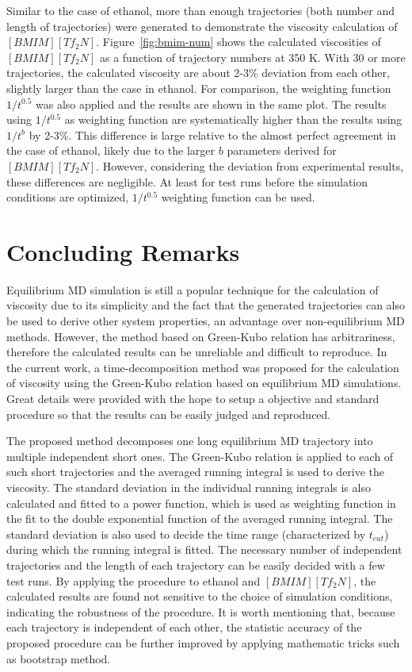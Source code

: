 \documentclass[12pt]{article}
\begin{document}
Similar to the case of ethanol,
more than enough trajectories (both number and length of trajectories) were generated
to demonstrate the viscosity calculation of $[BMIM][Tf_2N]$.
Figure~\ref{fig:bmim-num} shows the calculated viscosities of $[BMIM][Tf_2N]$ as a function of trajectory numbers at 350 K.
With 30 or more trajectories,
the calculated viscosity are about 2-3\% deviation from each other,
slightly larger than the case in ethanol.
For comparison,
the weighting function $1/t^{0.5}$ was also applied and the results are shown in the same plot.
The results using $1/t^{0.5}$ as weighting function are systematically higher than the results using $1/t^b$ by 2-3\%.
This difference is large relative to the almost perfect agreement in the case of ethanol,
likely due to the larger $b$ parameters derived for $[BMIM][Tf_2N]$.
However, considering the deviation from experimental results,
these differences are negligible.
At least for test runs before the simulation conditions are optimized,
$1/t^{0.5}$ weighting function can be used.



\section{Concluding Remarks}

Equilibrium MD simulation is still a popular technique 
for the calculation of viscosity due to its simplicity
and the fact that the generated trajectories can also be used to derive other system properties,
an advantage over non-equilibrium MD methods.
However, the method based on Green-Kubo relation has arbitrariness,
therefore the calculated results can be unreliable and difficult to reproduce.
In the current work,
a time-decomposition method was proposed for the calculation of viscosity using the Green-Kubo relation 
based on equilibrium MD simulations.
Great details were provided with the hope to setup a objective and standard procedure
so that the results can be easily judged and reproduced.

The proposed method decomposes one long equilibrium MD trajectory into multiple independent short ones.
The Green-Kubo relation is applied to each of such short trajectories
and the averaged running integral is used to derive the viscosity.
The standard deviation in the individual running integrals is also calculated and fitted to a power function,
which is used as weighting function in the fit to the double exponential function of the averaged running integral.
The standard deviation is also used to decide the time range (characterized by $t_{cut}$) 
during which the running integral is fitted.
The necessary number of independent trajectories and the length of each trajectory can be easily decided with a few test runs.
By applying the procedure to ethanol and $[BMIM][Tf_2N]$,
the calculated results are found not sensitive to the choice of simulation conditions,
indicating the robustness of the procedure.
It is worth mentioning that,
because each trajectory is independent of each other,
the statistic accuracy of the proposed procedure can be further improved 
by applying mathematic tricks such as bootstrap method.
\cite{Bootstrap}
\end{document}
